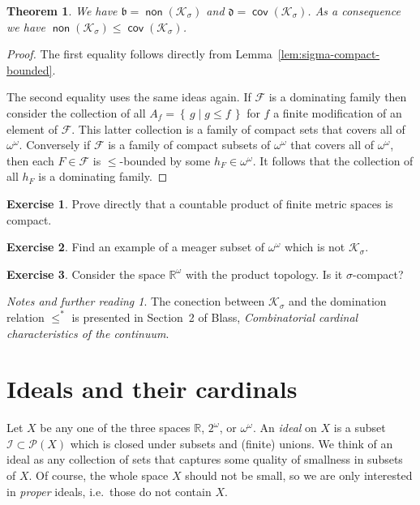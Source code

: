 \documentclass[11pt,oneside]{amsbook}
\newcommand{\set}[1]{\left\{\,#1\,\right\}}
\newcommand{\R}{\mathbb R}
\newcommand{\Ksigma}{\mathcal K_\sigma}
\DeclareMathOperator{\non}{\mathsf{non}}
\DeclareMathOperator{\cov}{\mathsf{cov}}
\theoremstyle{definition}
\newtheorem{exercise}{Exercise}[section]
\theoremstyle{plain}
\newtheorem{theorem}{Theorem}[section]
\theoremstyle{definition}
\theoremstyle{remark}
\newtheorem*{notes}{Notes and further reading}
\numberwithin{equation}{section}
\numberwithin{figure}{section}
\begin{document}
\begin{theorem}
  \label{thm:bd-vs-ksigma}
  We have $\mathfrak b=\non(\Ksigma)$ and $\mathfrak d=\cov(\Ksigma)$. As a consequence we have $\non(\Ksigma)\leq\cov(\Ksigma)$.
\end{theorem}

\begin{proof}
  The first equality follows directly from Lemma~\ref{lem:sigma-compact-bounded}.

  The second equality uses the same ideas again. If $\mathcal F$ is a dominating family then consider the collection of all $A_f=\set{g\mid g\leq f}$ for $f$ a finite modification of an element of $\mathcal F$. This latter collection is a family of compact sets that covers all of $\omega^\omega$. Conversely if $\mathcal F$ is a family of compact subsets of $\omega^\omega$ that covers all of $\omega^\omega$, then each $F\in\mathcal F$ is $\leq$-bounded by some $h_F\in\omega^\omega$. It follows that the collection of all $h_F$ is a dominating family.
\end{proof}

\begin{exercise}
  Prove directly that a countable product of finite metric spaces is compact.
\end{exercise}

\begin{exercise}
  Find an example of a meager subset of $\omega^\omega$ which is not $\Ksigma$.
\end{exercise}

\begin{exercise}
  Consider the space $\R^\omega$ with the product topology. Is it $\sigma$-compact?
\end{exercise}

\begin{notes}
  The conection between $\mathcal K_\sigma$ and the domination relation $\leq^*$ is presented in Section~2 of Blass, \emph{Combinatorial cardinal characteristics of the continuum}.
\end{notes}


\newpage
\section{Ideals and their cardinals}

Let $X$ be any one of the three spaces $\R$, $2^\omega$, or $\omega^\omega$. An \emph{ideal} on $X$ is a subset $\mathcal I\subset\mathcal P(X)$ which is closed under subsets and (finite) unions. We think of an ideal as any collection of sets that captures some quality of smallness in subsets of $X$. Of course, the whole space $X$ should not be small, so we are only interested in \emph{proper} ideals, i.e.\ those do not contain $X$.
\end{document}

